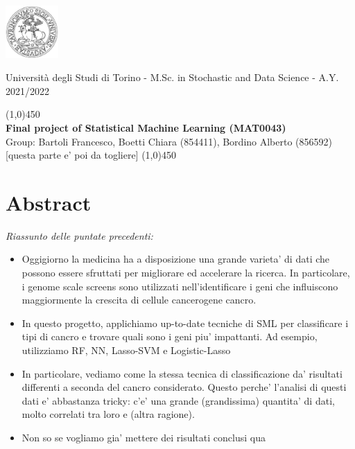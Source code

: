 \documentclass[a4paper,10pt, oneside]{article}  %
\begin{document}
\setcounter{secnumdepth}{2}
\pagestyle{plain} %

\centerline {\includegraphics[width=2cm]{logo.jpg}}
\begin{center}
Università degli Studi di Torino - M.Sc.  in Stochastic and Data Science - A.Y.  2021/2022

\line(1,0){450}\\ 
\vspace{0.1cm} 
{\Large \textbf{ Final project of Statistical Machine Learning (MAT0043)}} \\ 
\vspace{0.1cm}
\hspace{0cm} 
Group: Bartoli Francesco,  Boetti Chiara (854411), Bordino Alberto (856592) [questa parte e' poi da togliere]
\line(1,0){450} \\
\end{center}


\section*{Abstract}
\textit{Riassunto delle puntate precedenti:}
\begin{itemize}
\item Oggigiorno la medicina ha a disposizione una grande varieta' di dati che possono essere sfruttati per migliorare ed accelerare la ricerca. In particolare, i genome scale screens sono utilizzati nell'identificare i geni che influiscono maggiormente la crescita di cellule cancerogene cancro. \\
\item In questo progetto, applichiamo up-to-date tecniche di SML per classificare i tipi di cancro e trovare quali sono i geni piu' impattanti. Ad esempio, utilizziamo RF, NN, Lasso-SVM e Logistic-Lasso\\
\item In particolare, vediamo come la stessa tecnica di classificazione da' risultati differenti a seconda del cancro considerato. Questo perche' l'analisi di questi dati e' abbastanza tricky: c'e' una grande (grandissima) quantita' di dati, molto correlati tra loro e (altra ragione). \\
\item Non so se vogliamo gia' mettere dei risultati conclusi qua
\end{itemize}
\end{document}
